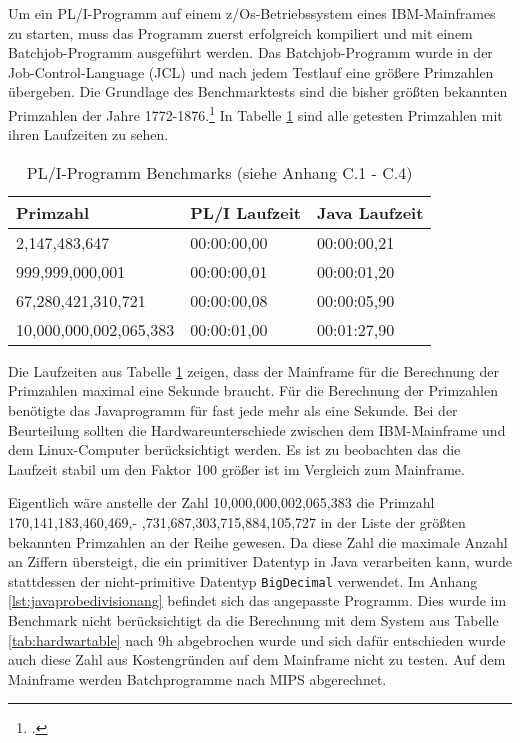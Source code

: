 Um ein PL/I-Programm auf einem z/Os-Betriebssystem eines IBM-Mainframes zu starten, muss das Programm zuerst erfolgreich kompiliert und mit einem Batchjob-Programm ausgeführt werden. Das Batchjob-Programm wurde in der Job-Control-Language (JCL) und nach jedem Testlauf eine größere Primzahlen übergeben.
Die Grundlage des Benchmarktests sind die bisher größten bekannten Primzahlen der Jahre 1772-1876.\footcite[Vgl. ][]{prime} In Tabelle \ref{tab:plibenchmark} sind alle getesten Primzahlen mit ihren Laufzeiten zu sehen. 

\begin{table}[h]
	\centering
	\begin{tabularx}{\textwidth}{|X|X|X|}
		\hline
		\textbf{Primzahl} & \textbf{PL/I Laufzeit} & \textbf{Java Laufzeit} \\
		\hline
		2,147,483,647 & 00:00:00,00 & 00:00:00,21 \\
		
		999,999,000,001 & 00:00:00,01 & 00:00:01,20\\
		
		67,280,421,310,721 & 00:00:00,08 & 00:00:05,90 \\
		
		10,000,000,002,065,383 & 00:00:01,00 & 00:01:27,90 \\
		\hline
	\end{tabularx}
	\caption{PL/I-Programm Benchmarks (siehe Anhang C.1 - C.4) \label{tab:plibenchmark}}
\end{table}


Die Laufzeiten aus Tabelle \ref{tab:plibenchmark} zeigen, dass der Mainframe für die Berechnung der Primzahlen maximal eine Sekunde braucht. Für die Berechnung der Primzahlen benötigte das Javaprogramm für fast jede mehr als eine Sekunde. Bei der Beurteilung sollten die Hardwareunterschiede zwischen dem IBM-Mainframe und dem Linux-Computer berücksichtigt werden. Es ist zu beobachten das die Laufzeit stabil um den Faktor 100 größer ist im Vergleich zum Mainframe.

Eigentlich wäre anstelle der Zahl 10,000,000,002,065,383 die Primzahl 170,141,183,460,469,- ,731,687,303,715,884,105,727 in der Liste der größten bekannten Primzahlen an der Reihe gewesen. 
Da diese Zahl die maximale Anzahl an Ziffern übersteigt, die ein primitiver Datentyp in Java verarbeiten kann, wurde stattdessen der nicht-primitive Datentyp \verb+BigDecimal+ verwendet. Im Anhang \ref{lst:javaprobedivisionang} befindet sich das angepasste Programm. 
Dies wurde im Benchmark nicht berücksichtigt da die Berechnung mit dem System aus Tabelle \ref{tab:hardwartable} nach 9h abgebrochen wurde und sich dafür entschieden wurde auch diese Zahl aus Kostengründen auf dem Mainframe nicht zu testen. Auf dem Mainframe werden Batchprogramme nach \ac{MIPS} abgerechnet.

